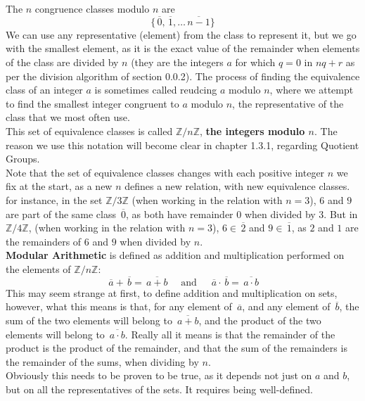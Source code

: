 \documentclass[12pt]{article}
\newcommand{\Z}{\mathbb{Z}}
\newcommand{\olsi}[1]{\,\overline{\!{#1}}}
\begin{document}
    The $n$ congruence classes modulo $n$ are
    \[ \{ \olsi{0}, \olsi{1}, \dots \olsi{n-1} \} \]
    We can use any representative (element) from the class
    to represent it,
    but we go with the smallest element,
    as it is the exact value of the remainder
    when elements of the class are divided by $n$
    (they are the integers $a$ for which $q = 0$ in $nq + r$
    as per the division algorithm of section 0.0.2).
    The process of finding the equivalence class of an integer $a$
    is sometimes called reudcing $a$ modulo $n$,
    where we attempt to find
    the smallest integer congruent to $a$ modulo $n$,
    the representative of the class that we most often use. \\
    This set of equivalence classes is called $\Z/n\Z$,
    \textbf{the integers modulo $\mathbf{\textit{n}}$}.
    The reason we use this notation will become clear
    in chapter 1.3.1, regarding Quotient Groups. \\

    Note that the set of equivalence classes changes with
    each positive integer $n$ we fix at the start,
    as a new $n$ defines a new relation,
    with new equivalence classes.
    for instance, in the set $\Z/3\Z$
    (when working in the relation with $n = 3$),
    $6$ and $9$ are part of the same class $\olsi{0}$,
    as both have remainder $0$ when divided by $3$. 
    But in $\Z/4\Z$,
    (when working in the relation with $n = 3$),
    $6 \in \olsi{2}$ and $9 \in \olsi{1}$,
    as $2$ and $1$ are the remainders of $6$ and $9$
    when divided by $n$. \\

    \textbf{Modular Arithmetic} is defined as addition and multiplication
    performed on the elements of $\Z/n\Z$:
    \[ \olsi{a} + \olsi{b} = \olsi{a + b} 
    \quad \text{ and } \quad
    \olsi{a} \cdot \olsi{b} = \olsi{a \cdot b} \]
    This may seem strange at first,
    to define addition and multiplication on sets,
    however,
    what this means is that,
    for any element of $\olsi{a}$,
    and any element of $\olsi{b}$,
    the sum of the two elements will belong to $\olsi{a + b}$,
    and the product of the two elements
    will belong to $\olsi{a \cdot b}$.
    Really all it means is that the remainder of the product
    is the product of the remainder,
    and that the sum of the remainders is the remainder of the sums,
    when dividing by $n$. \\
    Obviously this needs to be proven to be true,
    as it depends not just on $a$ and $b$,
    but on all the representatives of the sets. 
    It requires being well-defined. \\
\end{document}
